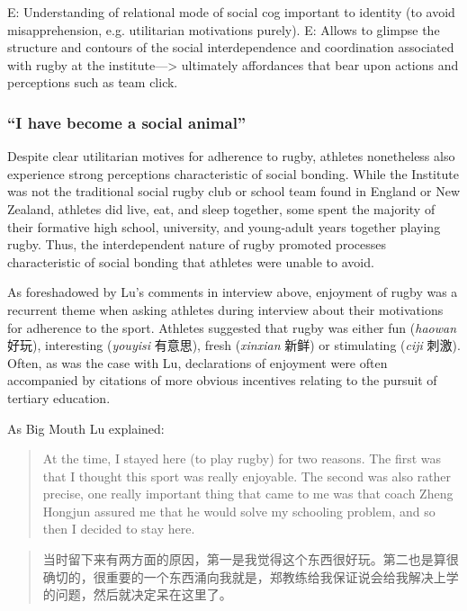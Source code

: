 \begin{CJK}{UTF8}{gbsn}
E: Understanding of relational mode of social cog important to identity (to avoid misapprehension, e.g. utilitarian motivations purely).
E: Allows to glimpse the structure and contours of the social interdependence and coordination associated with rugby at the institute---> ultimately affordances that bear upon actions and perceptions such as team click.











\subsubsection{``I have become a social animal''\label{sect:socialAnimal}}
Despite clear utilitarian motives for adherence to rugby, athletes nonetheless also experience strong perceptions characteristic of social bonding.  While the Institute was not the traditional social rugby club or school team found in England or New Zealand, athletes  did live, eat, and sleep together, some spent the majority of their formative high school, university, and young-adult years together playing rugby.  Thus, the interdependent nature of rugby promoted processes characteristic of social bonding that athletes were unable to avoid.

As foreshadowed by Lu's comments in interview above, enjoyment of rugby was a recurrent theme when asking athletes during interview about their motivations for adherence to the sport.  Athletes suggested that rugby was either fun (\textit{haowan} 好玩), interesting (\textit{youyisi} 有意思), fresh (\textit{xinxian} 新鲜) or stimulating (\textit{ciji} 刺激).  Often, as was the case with Lu, declarations of enjoyment were often accompanied by citations of more obvious incentives relating to the pursuit of tertiary education.

  As Big Mouth Lu explained:
            \begin{quote}
                At the time, I stayed here (to play rugby) for two reasons.  The first was that I thought this sport was really enjoyable. The second was also rather precise, one really important thing that came to me was that coach Zheng Hongjun assured me that he would solve my schooling problem, and so then I decided to stay here.
              \end{quote}
             \begin{quote}
                 当时留下来有两方面的原因，第一是我觉得这个东西很好玩。第二也是算很确切的，很重要的一个东西涌向我就是，郑教练给我保证说会给我解决上学的问题，然后就决定呆在这里了。
               \end{quote}


\end{CJK}
